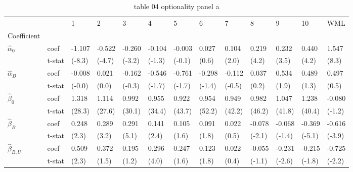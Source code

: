 \begin{table}[htbp]
  \centering
  \caption{table 04 optionality panel a}
  \label{tab:table_04_optionality_panel_a}
  \begin{tabular}{lllllllllllll}
\toprule
 &  & 1 & 2 & 3 & 4 & 5 & 6 & 7 & 8 & 9 & 10 & WML \\
Coefficient &  &  &  &  &  &  &  &  &  &  &  &  \\
\midrule
\multirow[t]{2}{*}{$\hat{\alpha}_0$} & coef & -1.107 & -0.522 & -0.260 & -0.104 & -0.003 & 0.027 & 0.104 & 0.219 & 0.232 & 0.440 & 1.547 \\
 & t-stat & (-8.3) & (-4.7) & (-3.2) & (-1.3) & (-0.1) & (0.6) & (2.0) & (4.2) & (3.5) & (4.2) & (8.3) \\
\cline{1-13}
\multirow[t]{2}{*}{$\hat{\alpha}_B$} & coef & -0.008 & 0.021 & -0.162 & -0.546 & -0.761 & -0.298 & -0.112 & 0.037 & 0.534 & 0.489 & 0.497 \\
 & t-stat & (-0.0) & (0.0) & (-0.3) & (-1.7) & (-1.7) & (-1.4) & (-0.5) & (0.2) & (1.9) & (1.3) & (0.5) \\
\cline{1-13}
\multirow[t]{2}{*}{$\hat{\beta}_0$} & coef & 1.318 & 1.114 & 0.992 & 0.955 & 0.922 & 0.954 & 0.949 & 0.982 & 1.047 & 1.238 & -0.080 \\
 & t-stat & (28.3) & (27.6) & (30.1) & (34.4) & (43.7) & (52.2) & (42.2) & (46.2) & (41.8) & (40.4) & (-1.2) \\
\cline{1-13}
\multirow[t]{2}{*}{$\hat{\beta}_B$} & coef & 0.248 & 0.289 & 0.291 & 0.141 & 0.105 & 0.091 & 0.022 & -0.078 & -0.068 & -0.369 & -0.616 \\
 & t-stat & (2.3) & (3.2) & (5.1) & (2.4) & (1.6) & (1.8) & (0.5) & (-2.1) & (-1.4) & (-5.1) & (-3.9) \\
\cline{1-13}
\multirow[t]{2}{*}{$\hat{\beta}_{B,U}$} & coef & 0.509 & 0.372 & 0.195 & 0.296 & 0.247 & 0.123 & 0.022 & -0.055 & -0.231 & -0.215 & -0.725 \\
 & t-stat & (2.3) & (1.5) & (1.2) & (4.0) & (1.6) & (1.8) & (0.4) & (-1.1) & (-2.6) & (-1.8) & (-2.2) \\
\cline{1-13}
\bottomrule
\end{tabular}
\end{table}
